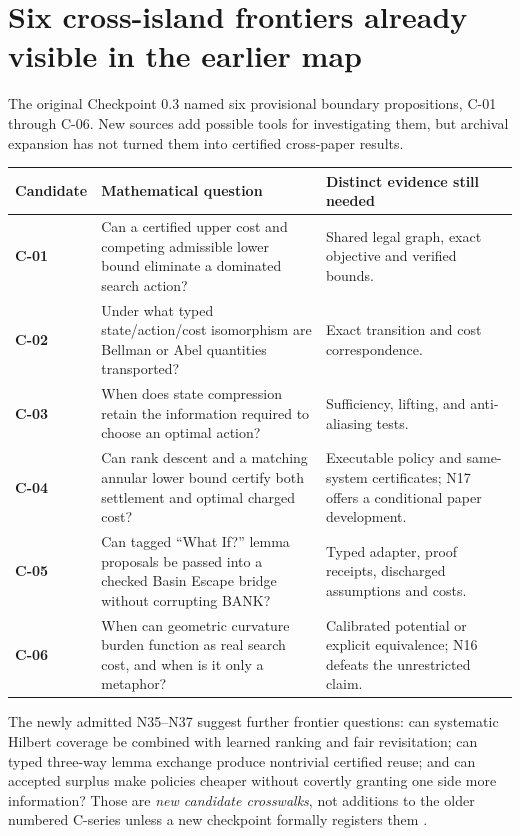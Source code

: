 \documentclass[11pt,letterpaper,oneside]{article}
\begin{document}
\section{Six cross-island frontiers already visible in the earlier map}
The original Checkpoint 0.3 named six provisional boundary propositions, C-01 through C-06. New sources add possible tools for investigating them, but archival expansion has not turned them into certified cross-paper results.

\begin{center}
\small
\begin{tabularx}{\textwidth}{@{}>{\bfseries\color{deepsea}}p{.75in} X p{2.22in}@{}}
\toprule
Candidate & Mathematical question & Distinct evidence still needed \\
\midrule
C-01 & Can a certified upper cost and competing admissible lower bound eliminate a dominated search action? & Shared legal graph, exact objective and verified bounds.\\
C-02 & Under what typed state/action/cost isomorphism are Bellman or Abel quantities transported? & Exact transition and cost correspondence.\\
C-03 & When does state compression retain the information required to choose an optimal action? & Sufficiency, lifting, and anti-aliasing tests.\\
C-04 & Can rank descent and a matching annular lower bound certify both settlement and optimal charged cost? & Executable policy and same-system certificates; N17 offers a conditional paper development.\\
C-05 & Can tagged ``What If?'' lemma proposals be passed into a checked Basin Escape bridge without corrupting BANK? & Typed adapter, proof receipts, discharged assumptions and costs.\\
C-06 & When can geometric curvature burden function as real search cost, and when is it only a metaphor? & Calibrated potential or explicit equivalence; N16 defeats the unrestricted claim.\\
\bottomrule
\end{tabularx}
\end{center}

The newly admitted N35--N37 suggest further frontier questions: can systematic Hilbert coverage be combined with learned ranking and fair revisitation; can typed three-way lemma exchange produce nontrivial certified reuse; and can accepted surplus make policies cheaper without covertly granting one side more information? Those are \emph{new candidate crosswalks}, not additions to the older numbered C-series unless a new checkpoint formally registers them \cite{n35,n36,n37}.
\end{document}
